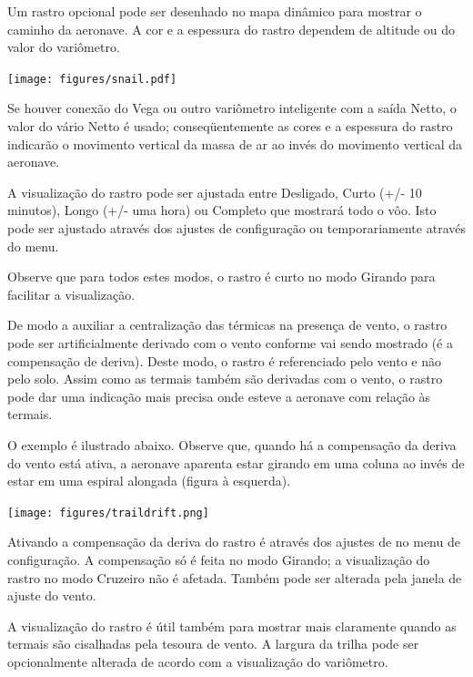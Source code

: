 Um rastro opcional pode ser desenhado no mapa dinâmico para mostrar o caminho da aeronave.  A cor e a espessura do rastro dependem de altitude ou do valor do variômetro.


\begin{center}
\texttt{[image: figures/snail.pdf]}
\end{center}

Se houver conexão do Vega ou outro variômetro inteligente com a saída Netto, o valor do vário Netto é usado; conseqüentemente as cores e a espessura do rastro indicarão o movimento vertical da massa de ar ao invés do movimento vertical da aeronave.

A visualização do rastro pode ser ajustada entre Desligado, Curto (+/- 10 minutos), Longo (+/- uma hora) ou Completo que mostrará todo o vôo.  Isto pode ser ajustado através dos ajustes de configuração ou temporariamente através do menu.

Observe que para todos estes modos, o rastro é curto no modo Girando para facilitar a visualização.

De modo a auxiliar a centralização das térmicas na presença de vento, o rastro pode ser artificialmente derivado com o vento conforme vai sendo mostrado (é a compensação de deriva).  Deste modo, o rastro é referenciado pelo vento e não pelo solo.  Assim como as termais também são derivadas com o vento, o rastro pode dar uma indicação mais precisa onde esteve a aeronave com relação às termais.

O exemplo é ilustrado abaixo.  Observe que, quando há a compensação da deriva do vento está ativa, a aeronave aparenta estar girando em uma coluna ao invés de estar em uma espiral alongada (figura à esquerda).

\begin{center}
\texttt{[image: figures/traildrift.png]}
\end{center}

Ativando a compensação da deriva do rastro é através dos ajustes de no menu de configuração. A compensação só é feita no modo Girando; a visualização do rastro no modo Cruzeiro não é afetada.  Também pode ser alterada pela janela de ajuste do vento.

A visualização do rastro é útil também para mostrar mais claramente quando as termais são cisalhadas pela tesoura de vento.
A largura da trilha pode ser opcionalmente alterada de acordo com a visualização do variômetro.  


